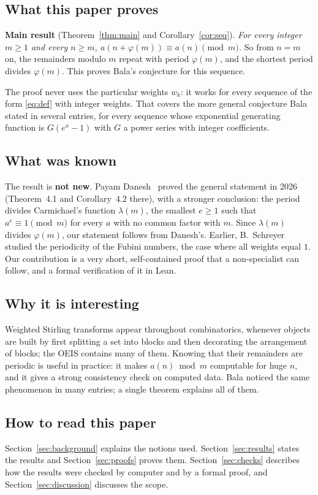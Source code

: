 \documentclass[11pt,a4paper]{article}
\theoremstyle{definition}
\theoremstyle{remark}
\begin{document}
\subsection{What this paper proves}
\textbf{Main result} (Theorem~\ref{thm:main} and Corollary~\ref{cor:seq}). \emph{For every integer $m\ge1$ and every
$n\ge m$, $a(n+\varphi(m))\equiv a(n)\pmod m$.} So from $n=m$ on, the remainders modulo $m$ repeat with period
$\varphi(m)$, and the shortest period divides $\varphi(m)$. This proves Bala's conjecture for this sequence.

The proof never uses the particular weights $w_k$: it works for every sequence of the form \eqref{eq:def} with
integer weights. That covers the more general conjecture Bala stated in several entries, for every sequence whose
exponential generating function is $G(e^x-1)$ with $G$ a power series with integer coefficients.

\subsection{What was known}
The result is \textbf{not new}. Payam Danesh~\cite{danesh} proved the general statement in 2026 (Theorem~4.1 and
Corollary~4.2 there), with a stronger conclusion: the period divides Carmichael's function $\lambda(m)$, the smallest
$e\ge1$ such that $a^e\equiv1\pmod m$ for every $a$ with no common factor with $m$. Since $\lambda(m)$ divides
$\varphi(m)$, our statement follows from Danesh's. Earlier, B.~Schreyer~\cite{schreyer} studied the periodicity of the
Fubini numbers, the case where all weights equal $1$. Our contribution is a very short, self-contained proof that a
non-specialist can follow, and a formal verification of it in Lean.

\subsection{Why it is interesting}
Weighted Stirling transforms appear throughout combinatorics, whenever objects are built by first splitting a set into
blocks and then decorating the arrangement of blocks; the OEIS contains many of them. Knowing that their remainders are
periodic is useful in practice: it makes $a(n)\bmod m$ computable for huge $n$, and it gives a strong consistency check
on computed data. Bala noticed the same phenomenon in many entries; a single theorem explains all of them.

\subsection{How to read this paper}
Section~\ref{sec:background} explains the notions used. Section~\ref{sec:results} states the results and
Section~\ref{sec:proofs} proves them. Section~\ref{sec:checks} describes how the results were checked by computer and by a
formal proof, and Section~\ref{sec:discussion} discusses the scope.
\end{document}
